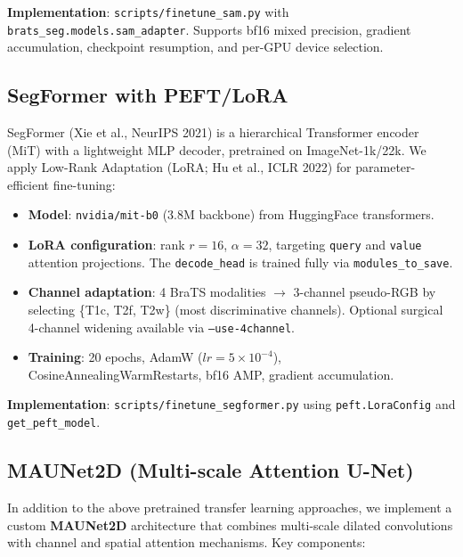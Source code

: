 \documentclass[11pt,a4paper]{article}
\begin{document}
\textbf{Implementation}: \texttt{scripts/finetune\_sam.py} with \texttt{brats\_seg.models.sam\_adapter}. Supports bf16 mixed precision, gradient accumulation, checkpoint resumption, and per-GPU device selection.

\subsection{SegFormer with PEFT/LoRA}

SegFormer (Xie et al., NeurIPS 2021) is a hierarchical Transformer encoder (MiT) with a lightweight MLP decoder, pretrained on ImageNet-1k/22k. We apply Low-Rank Adaptation (LoRA; Hu et al., ICLR 2022) for parameter-efficient fine-tuning:

\begin{itemize}
  \item \textbf{Model}: \texttt{nvidia/mit-b0} (3.8M backbone) from HuggingFace transformers.
  \item \textbf{LoRA configuration}: rank $r=16$, $\alpha=32$, targeting \texttt{query} and \texttt{value} attention projections. The \texttt{decode\_head} is trained fully via \texttt{modules\_to\_save}.
  \item \textbf{Channel adaptation}: 4 BraTS modalities $\rightarrow$ 3-channel pseudo-RGB by selecting \{T1c, T2f, T2w\} (most discriminative channels). Optional surgical 4-channel widening available via \texttt{--use-4channel}.
  \item \textbf{Training}: 20 epochs, AdamW ($lr=5\times10^{-4}$), CosineAnnealingWarmRestarts, bf16 AMP, gradient accumulation.
\end{itemize}

\textbf{Implementation}: \texttt{scripts/finetune\_segformer.py} using \texttt{peft.LoraConfig} and \texttt{get\_peft\_model}.

\subsection{MAUNet2D (Multi-scale Attention U-Net)}

In addition to the above pretrained transfer learning approaches, we implement a custom \textbf{MAUNet2D} architecture that combines multi-scale dilated convolutions with channel and spatial attention mechanisms. Key components:
\end{document}
